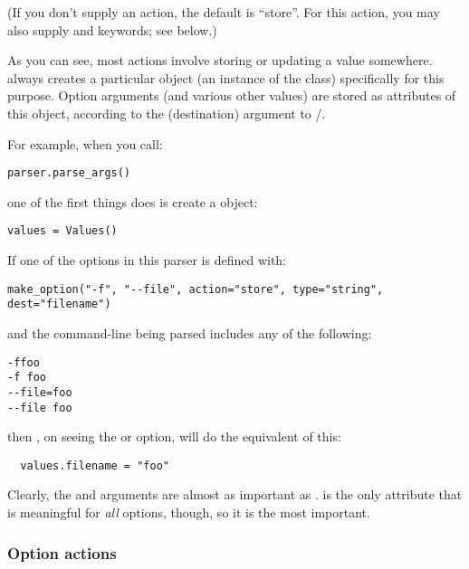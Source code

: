(If you don't supply an action, the default is ``store''.  For this
action, you may also supply  and  keywords; see
below.)

As you can see, most actions involve storing or updating a value
somewhere.  always creates a particular object (an
instance of the  class) specifically for this
purpose. Option arguments (and various other values) are stored as
attributes of this object, according to the  (destination)
argument to /.

For example, when you call:

\begin{verbatim}
parser.parse_args()
\end{verbatim}

one of the first things  does is create a
 object:

\begin{verbatim}
values = Values()
\end{verbatim}

If one of the options in this parser is defined with:

\begin{verbatim}
make_option("-f", "--file", action="store", type="string", dest="filename")
\end{verbatim}

and the command-line being parsed includes any of the following:

\begin{verbatim}
-ffoo
-f foo
--file=foo
--file foo
\end{verbatim}

then , on seeing the  or
 option, will do the equivalent of this:

\begin{verbatim}
  values.filename = "foo"
\end{verbatim}

Clearly, the  and  arguments are almost
as important as .   is the only attribute that
is meaningful for \emph{all} options, though, so it is the most
important.

\subsubsection{Option actions\label{optparse-option-actions}}


